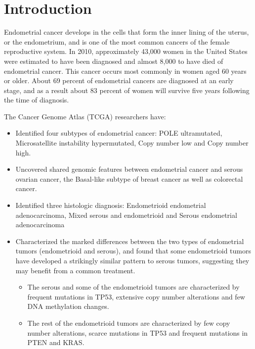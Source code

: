 \documentclass[9pt,twocolumn,twoside]{gsajnl}
\begin{document}
\section*{Introduction}

Endometrial cancer develops in the cells that form the inner lining of the uterus, or the endometrium, and is one of the most common cancers of the female reproductive system. In 2010, approximately 43,000 women in the United States were estimated to have been diagnosed and almost 8,000 to have died of endometrial cancer. This cancer occurs most commonly in women aged 60 years or older. About 69 percent of endometrial cancers are diagnosed at an early stage, and as a result about 83 percent of women will survive five years following the time of diagnosis.

The Cancer Genome Atlas (TCGA) \citep{TheCancerGenomeAtlas} researchers have: 
\begin{itemize}
\item Identified four subtypes of endometrial cancer: POLE ultramutated, Microsatellite instability hypermutated, Copy number low and Copy number high.
\item Uncovered shared genomic features between endometrial cancer and serous ovarian cancer, the Basal-like subtype of breast cancer as well as colorectal cancer.
\item Identified three histologic diagnosis: Endometrioid endometrial adenocarcinoma, Mixed serous and endometrioid and Serous endometrial adenocarcinoma
\item Characterized the marked differences between the two types of endometrial tumors (endometrioid and serous), and found that some endometrioid tumors have developed a strikingly similar pattern to serous tumors, suggesting they may benefit from a common treatment.
\begin{itemize}
\item The serous and some of the endometrioid tumors are characterized by frequent mutations in TP53, extensive copy number alterations and few DNA methylation changes.
\item The rest of the endometrioid tumors are characterized by few copy number alterations, scarce mutations in TP53 and frequent mutations in PTEN and KRAS.
\end{itemize}
\end{itemize}


\end{document}
